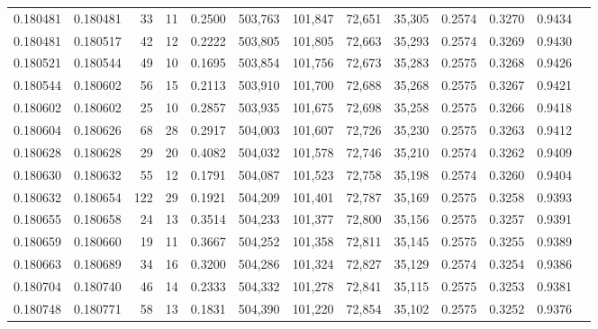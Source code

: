 \begin{tabular}{rrrrrrrrrrrrr}
0.180481 & 0.180481 &    33 &  11 &                                     0.2500 & 503,763 & 101,847 &  72,651 &  35,305 & 0.2574 & 0.3270 & 0.9434 \\
0.180481 & 0.180517 &    42 &  12 &                                     0.2222 & 503,805 & 101,805 &  72,663 &  35,293 & 0.2574 & 0.3269 & 0.9430 \\
0.180521 & 0.180544 &    49 &  10 &                                     0.1695 & 503,854 & 101,756 &  72,673 &  35,283 & 0.2575 & 0.3268 & 0.9426 \\
0.180544 & 0.180602 &    56 &  15 &                                     0.2113 & 503,910 & 101,700 &  72,688 &  35,268 & 0.2575 & 0.3267 & 0.9421 \\
0.180602 & 0.180602 &    25 &  10 &                                     0.2857 & 503,935 & 101,675 &  72,698 &  35,258 & 0.2575 & 0.3266 & 0.9418 \\
0.180604 & 0.180626 &    68 &  28 &                                     0.2917 & 504,003 & 101,607 &  72,726 &  35,230 & 0.2575 & 0.3263 & 0.9412 \\
0.180628 & 0.180628 &    29 &  20 &                                     0.4082 & 504,032 & 101,578 &  72,746 &  35,210 & 0.2574 & 0.3262 & 0.9409 \\
0.180630 & 0.180632 &    55 &  12 &                                     0.1791 & 504,087 & 101,523 &  72,758 &  35,198 & 0.2574 & 0.3260 & 0.9404 \\
0.180632 & 0.180654 &   122 &  29 &                                     0.1921 & 504,209 & 101,401 &  72,787 &  35,169 & 0.2575 & 0.3258 & 0.9393 \\
0.180655 & 0.180658 &    24 &  13 &                                     0.3514 & 504,233 & 101,377 &  72,800 &  35,156 & 0.2575 & 0.3257 & 0.9391 \\
0.180659 & 0.180660 &    19 &  11 &                                     0.3667 & 504,252 & 101,358 &  72,811 &  35,145 & 0.2575 & 0.3255 & 0.9389 \\
0.180663 & 0.180689 &    34 &  16 &                                     0.3200 & 504,286 & 101,324 &  72,827 &  35,129 & 0.2574 & 0.3254 & 0.9386 \\
0.180704 & 0.180740 &    46 &  14 &                                     0.2333 & 504,332 & 101,278 &  72,841 &  35,115 & 0.2575 & 0.3253 & 0.9381 \\
0.180748 & 0.180771 &    58 &  13 &                                     0.1831 & 504,390 & 101,220 &  72,854 &  35,102 & 0.2575 & 0.3252 & 0.9376 \\

\end{tabular}
